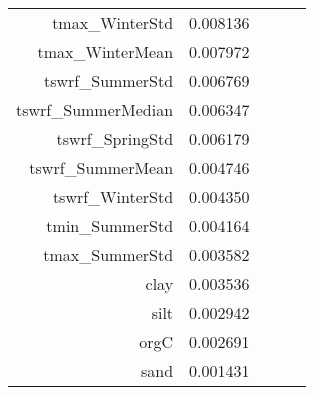 \begin{tabular}{rrrrr}
tmax_WinterStd & 0.008136 \\
tmax_WinterMean & 0.007972 \\
tswrf_SummerStd & 0.006769 \\
tswrf_SummerMedian & 0.006347 \\
tswrf_SpringStd & 0.006179 \\
tswrf_SummerMean & 0.004746 \\
tswrf_WinterStd & 0.004350 \\
tmin_SummerStd & 0.004164 \\
tmax_SummerStd & 0.003582 \\
clay & 0.003536 \\
silt & 0.002942 \\
orgC & 0.002691 \\
sand & 0.001431 \\
\bottomrule
\end{tabular}
